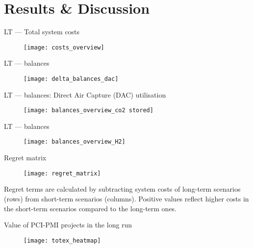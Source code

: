 \documentclass[10pt,aspectratio=169,dvipsnames]{beamer}
\begin{document}
\section{Results \& Discussion}
\begin{frame}{LT --- Total system costs}
  \begin{figure}[htbp]
    \centering
    \texttt{[image: costs\_overview]}
  \end{figure}
\end{frame}

\begin{frame}{LT ---  balances}
  \begin{figure}[htbp]
    \centering
    \texttt{[image: delta\_balances\_dac]}
  \end{figure}
\end{frame}

\begin{frame}{LT ---  balances: Direct Air Capture (DAC) utilisation}
  \begin{figure}[htbp]
    \centering
    \texttt{[image: balances\_overview\_co2 stored]}
  \end{figure}
\end{frame}

\begin{frame}{LT ---  balances}
  \begin{figure}[htbp]
    \centering
    \texttt{[image: balances\_overview\_H2]}
  \end{figure}
\end{frame}

\begin{frame}{Regret matrix}
  \begin{figure}[htbp]
    \centering
    \texttt{[image: regret\_matrix]}
  \end{figure}
  \scriptsize
  \centering
  Regret terms are calculated by subtracting system costs of long-term scenarios (rows) from short-term scenarios (columns). Positive values reflect higher costs in the short-term scenarios compared to the long-term ones.
\end{frame}

\begin{frame}{Value of PCI-PMI projects in the long run}
  \begin{figure}[htbp]
    \centering
    \texttt{[image: totex\_heatmap]}
  \end{figure}
\end{frame}
\end{document}
